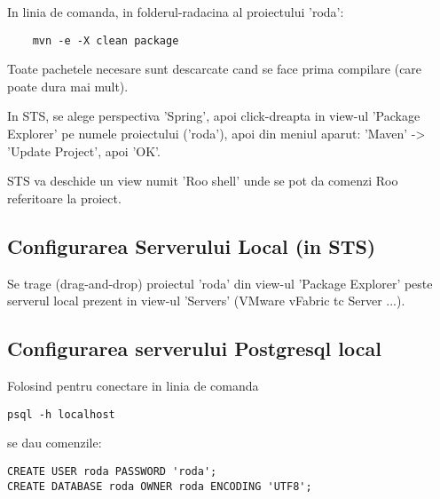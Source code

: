 In linia de comanda, in folderul-radacina al proiectului 'roda':
\begin{lstlisting}
	mvn -e -X clean package
\end{lstlisting}

Toate pachetele necesare sunt descarcate cand se face prima compilare (care poate dura mai mult).

In STS, se alege perspectiva 'Spring', apoi click-dreapta in view-ul 'Package
Explorer' pe numele proiectului ('roda'), apoi din meniul aparut:
'Maven' -> 'Update Project', apoi 'OK'.

STS va deschide un view numit 'Roo shell' unde se pot da comenzi Roo referitoare
la proiect.

\subsection{Configurarea Serverului Local (in STS)}
Se trage (drag-and-drop) proiectul 'roda' din view-ul 'Package Explorer' 
peste serverul local prezent in view-ul 'Servers' (VMware vFabric tc Server ...).

\subsection{Configurarea serverului Postgresql local}
Folosind pentru conectare in linia de comanda
\begin{lstlisting}
psql -h localhost
\end{lstlisting}
se dau comenzile:
\begin{lstlisting}
CREATE USER roda PASSWORD 'roda';
CREATE DATABASE roda OWNER roda ENCODING 'UTF8';
\end{lstlisting}


